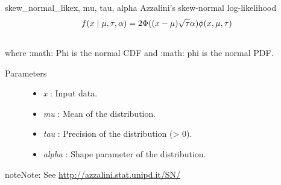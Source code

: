 \hypertarget{pymc.distributions.skew_normal_like}{}\begin{funcdesc}{skew\_normal\_like}{x, mu, tau, alpha}
Azzalini's skew-normal log-likelihood
\begin{gather}
\begin{split}f(x \mid \mu, \tau, \alpha) = 2 \Phi((x-\mu)\sqrt{\tau}\alpha) \phi(x,\mu,\tau)\end{split}\notag\\\begin{split}\end{split}\notag
\end{gather}
where :math: Phi is the normal CDF and :math: phi is the normal PDF.
\begin{description}
\item[Parameters] \leavevmode\begin{itemize}
\item {} 
\emph{x} : Input data.

\item {} 
\emph{mu} : Mean of the distribution.

\item {} 
\emph{tau} : Precision of the distribution (\textgreater{} 0).

\item {} 
\emph{alpha} : Shape parameter of the distribution.

\end{itemize}

\end{description}

\begin{notice}{note}{Note:}
See \href{http://azzalini.stat.unipd.it/SN/}{http://azzalini.stat.unipd.it/SN/}
\end{notice}
\end{funcdesc}

